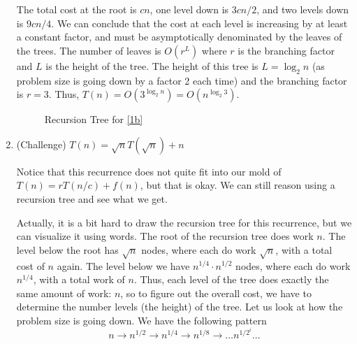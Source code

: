 \documentclass[12pt]{article}
\theoremstyle{definition}
\begin{document}
\begin{enumerate}[label = (\alph*)]
     The total cost at the root is $cn$, one level down is $3cn/2$, and two levels down is $9 cn/4$.
     We can conclude that the cost at each level is increasing by at least a constant factor, and must be asymptotically denominated by the leaves of the trees.  The number of leaves is $O(r^L)$ where $r$ is the branching factor and $L$ is the height of the tree.  The height of this tree is $L = \log_2 n$ (as problem size is going down by a factor 2 each time) and the branching factor is $r = 3$.  Thus, $T(n) = O(3^{\log_2 n}) = O(n^{\log_2 3})$.
    \begin{figure}[H]
    \vspace{-5pt} 
    \centering
    \caption{Recursion Tree for \ref{1b}}\label{rectree2}
    \end{figure}   
    \vspace{-5pt} 

  \item (Challenge) $T(n) = \sqrt{n} T(\sqrt{n}) + n$
  
  Notice that this recurrence does not quite fit into our mold of $T(n) = r T(n/c) + f(n)$, but that is okay.  We can still reason using a recursion tree and see what we get. 
  
  Actually, it is a bit hard to draw the recursion tree for this recurrence, but we can visualize it using words.  The root of the recursion tree does work $n$. The level below the root has $\sqrt{n}$ nodes, where each do work $\sqrt{n}$, with a total cost of $n$ again.  The level below we have $n^{1/4} \cdot n^{1/2}$ nodes, where each do work $n^{1/4}$, with a total work of $n$.  Thus, each level of the tree does exactly the same amount of work: $n$, so to figure out the overall cost, we have to determine the number levels (the height) of the tree.  Let us look at how the problem size is going down.  We have the following pattern 
  \[n \rightarrow n^{1/2} \rightarrow n^{1/4} \rightarrow n^{1/8} \rightarrow \ldots n^{1/2^i} \ldots\]
  

\end{enumerate}
\end{document}
